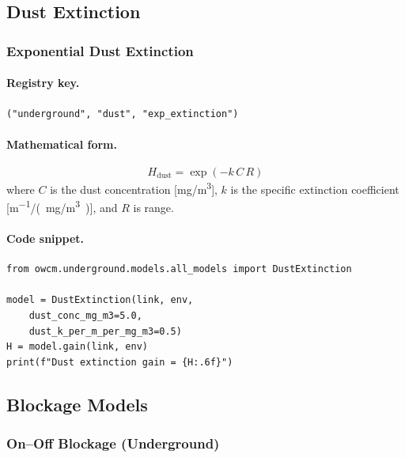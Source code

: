 \documentclass[11pt,a4paper]{article}
\begin{document}
\subsection{Dust Extinction}

\subsubsection{Exponential Dust Extinction}
\label{sec:dust_extinction}

\paragraph{Registry key.} \texttt{("underground", "dust", "exp\_extinction")}

\paragraph{Mathematical form.}
\begin{equation}
\boxed{H_{\text{dust}} = \exp(-k\,C\,R)}
\end{equation}
where $C$ is the dust concentration [\si{mg/m^3}], $k$ is the specific
extinction coefficient [\si{m^{-1}/(mg/m^3)}], and $R$ is range.

\paragraph{Code snippet.}
\begin{lstlisting}
from owcm.underground.models.all_models import DustExtinction

model = DustExtinction(link, env,
    dust_conc_mg_m3=5.0,
    dust_k_per_m_per_mg_m3=0.5)
H = model.gain(link, env)
print(f"Dust extinction gain = {H:.6f}")
\end{lstlisting}

\subsection{Blockage Models}

\subsubsection{On--Off Blockage (Underground)}
\label{sec:ug_onoff}
\end{document}
